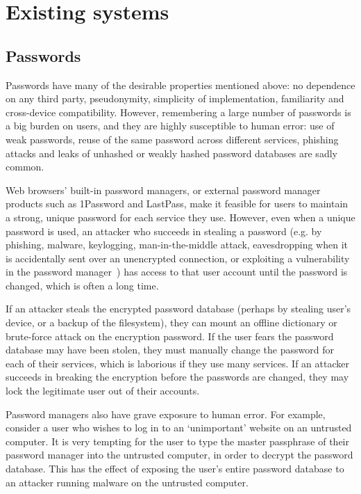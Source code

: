 \section{Existing systems}\label{sec:incumbents}
\subsection{Passwords}\label{sec:passwords}

Passwords have many of the desirable properties mentioned above: no dependence on any third party,
pseudonymity, simplicity of implementation, familiarity and cross-device compatibility. However,
remembering a large number of passwords is a big burden on users, and they are highly susceptible to
human error: use of weak passwords, reuse of the same password across different services, phishing
attacks and leaks of unhashed or weakly hashed password databases are sadly common.

Web browsers' built-in password managers, or external password manager products such as 1Password
and LastPass, make it feasible for users to maintain a strong, unique password for each service they
use. However, even when a unique password is used, an attacker who succeeds in stealing a password
(e.g. by phishing, malware, keylogging, man-in-the-middle attack, eavesdropping when it is
accidentally sent over an unencrypted connection, or exploiting a vulnerability in the password
manager~\cite{Li14, Silver14}) has access to that user account until the password is changed, which
is often a long time.

If an attacker steals the encrypted password database (perhaps by stealing user's device, or a
backup of the filesystem), they can mount an offline dictionary or brute-force attack on the
encryption password. If the user fears the password database may have been stolen, they must
manually change the password for each of their services, which is laborious if they use many
services. If an attacker succeeds in breaking the encryption before the passwords are changed, they
may lock the legitimate user out of their accounts.

Password managers also have grave exposure to human error. For example, consider a user who wishes
to log in to an `unimportant' website on an untrusted computer. It is very tempting for the user to
type the master passphrase of their password manager into the untrusted computer, in order to
decrypt the password database. This has the effect of exposing the user's entire password database
to an attacker running malware on the untrusted computer.

